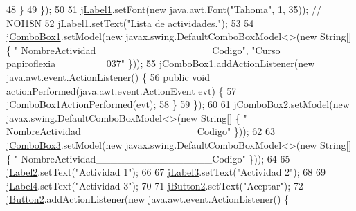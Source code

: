 \begin{DoxyCode}
48             \}
49         \});
50 
51         \mbox{\hyperlink{classsoftware_1_1parasoftware8_a0af03810fc1eb91384145459d5d48375}{jLabel1}}.setFont(\textcolor{keyword}{new} java.awt.Font(\textcolor{stringliteral}{"Tahoma"}, 1, 35)); \textcolor{comment}{// NOI18N}
52         \mbox{\hyperlink{classsoftware_1_1parasoftware8_a0af03810fc1eb91384145459d5d48375}{jLabel1}}.setText(\textcolor{stringliteral}{"Lista de actividades."});
53 
54         \mbox{\hyperlink{classsoftware_1_1parasoftware8_a29c30cbf2e2cc01d73b81863b7835ff4}{jComboBox1}}.setModel(\textcolor{keyword}{new} javax.swing.DefaultComboBoxModel<>(\textcolor{keyword}{new} String[] \{ \textcolor{stringliteral}{"
      NombreActividad\_\_\_\_\_\_\_\_\_\_\_\_\_\_\_\_Codigo"}, \textcolor{stringliteral}{"Curso papiroflexia\_\_\_\_\_\_\_037"} \}));
55         \mbox{\hyperlink{classsoftware_1_1parasoftware8_a29c30cbf2e2cc01d73b81863b7835ff4}{jComboBox1}}.addActionListener(\textcolor{keyword}{new} java.awt.event.ActionListener() \{
56             \textcolor{keyword}{public} \textcolor{keywordtype}{void} actionPerformed(java.awt.event.ActionEvent evt) \{
57                 \mbox{\hyperlink{classsoftware_1_1parasoftware8_a6787557a88e95173d633c83413960867}{jComboBox1ActionPerformed}}(evt);
58             \}
59         \});
60 
61         \mbox{\hyperlink{classsoftware_1_1parasoftware8_a71329b43eb81e69956806597744541ab}{jComboBox2}}.setModel(\textcolor{keyword}{new} javax.swing.DefaultComboBoxModel<>(\textcolor{keyword}{new} String[] \{ \textcolor{stringliteral}{"
      NombreActividad\_\_\_\_\_\_\_\_\_\_\_\_\_\_\_\_Codigo"} \}));
62 
63         \mbox{\hyperlink{classsoftware_1_1parasoftware8_aa9b1b8e891179cb15751500a6d649f88}{jComboBox3}}.setModel(\textcolor{keyword}{new} javax.swing.DefaultComboBoxModel<>(\textcolor{keyword}{new} String[] \{ \textcolor{stringliteral}{"
      NombreActividad\_\_\_\_\_\_\_\_\_\_\_\_\_\_\_\_Codigo"} \}));
64 
65         \mbox{\hyperlink{classsoftware_1_1parasoftware8_adf24ffebf260f0020405ef0620116cbc}{jLabel2}}.setText(\textcolor{stringliteral}{"Actividad 1"});
66 
67         \mbox{\hyperlink{classsoftware_1_1parasoftware8_a4595c84142064d5890fad24684355d2a}{jLabel3}}.setText(\textcolor{stringliteral}{"Actividad 2"});
68 
69         \mbox{\hyperlink{classsoftware_1_1parasoftware8_a31d6ce76b8ed34c98cea8fb17bebb099}{jLabel4}}.setText(\textcolor{stringliteral}{"Actividad 3"});
70 
71         \mbox{\hyperlink{classsoftware_1_1parasoftware8_a60ca7d4c0d486e0f63581416fddf3225}{jButton2}}.setText(\textcolor{stringliteral}{"Aceptar"});
72         \mbox{\hyperlink{classsoftware_1_1parasoftware8_a60ca7d4c0d486e0f63581416fddf3225}{jButton2}}.addActionListener(\textcolor{keyword}{new} java.awt.event.ActionListener() \{

\end{DoxyCode}

